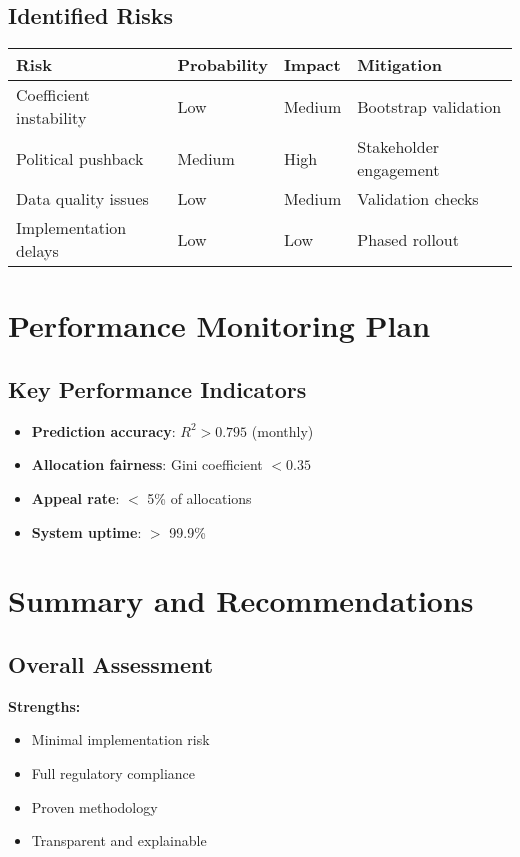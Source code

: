 \subsection{Identified Risks}

\begin{center}
\begin{tabular}{llll}
\toprule
Risk & Probability & Impact & Mitigation \\
\midrule
Coefficient instability & Low & Medium & Bootstrap validation \\
Political pushback & Medium & High & Stakeholder engagement \\
Data quality issues & Low & Medium & Validation checks \\
Implementation delays & Low & Low & Phased rollout \\
\bottomrule
\end{tabular}
\end{center}

\section{Performance Monitoring Plan}

\subsection{Key Performance Indicators}

\begin{itemize}
    \item \textbf{Prediction accuracy}: $R^2 > 0.795$ (monthly)
    \item \textbf{Allocation fairness}: Gini coefficient $< 0.35$
    \item \textbf{Appeal rate}: $<$ 5\% of allocations
    \item \textbf{System uptime}: $>$ 99.9\%
\end{itemize}

\section{Summary and Recommendations}

\subsection{Overall Assessment}

\textbf{Strengths:}
\begin{itemize}
    \item Minimal implementation risk
    \item Full regulatory compliance
    \item Proven methodology
    \item Transparent and explainable
\end{itemize}

